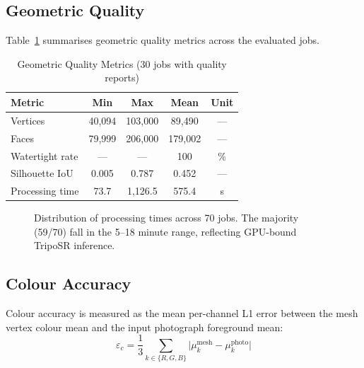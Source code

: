 ﻿\documentclass[conference]{IEEEtran}
\begin{document}
\subsection{Geometric Quality}

Table~\ref{tab:geom} summarises geometric quality metrics across the evaluated jobs.

\begin{table}[htbp]
\caption{Geometric Quality Metrics (30 jobs with quality reports)}
\label{tab:geom}
\centering
\begin{tabular}{lcccc}
\toprule
\textbf{Metric} & \textbf{Min} & \textbf{Max} & \textbf{Mean} & \textbf{Unit} \\
\midrule
Vertices          & 40{,}094 & 103{,}000 & 89{,}490 & --- \\
Faces             & 79{,}999 & 206{,}000 & 179{,}002 & --- \\
Watertight rate   & --- & --- & 100 & \% \\
Silhouette IoU    & 0.005 & 0.787 & 0.452 & --- \\
Processing time   & 73.7 & 1{,}126.5 & 575.4 & s \\
\bottomrule
\end{tabular}
\end{table}

\begin{figure}[htbp]
\centering
{}
\caption{Distribution of processing times across 70 jobs. The majority (59/70) fall in the 5--18 minute range,
reflecting GPU-bound TripoSR inference.}
\label{fig:times}
\end{figure}

\subsection{Colour Accuracy}

Colour accuracy is measured as the mean per-channel L1 error between the mesh vertex colour mean and the
input photograph foreground mean:
\begin{equation}
\varepsilon_c = \frac{1}{3} \sum_{k \in \{R,G,B\}} \bigl| \mu_k^{\text{mesh}} - \mu_k^{\text{photo}} \bigr|
\end{equation}
\end{document}
